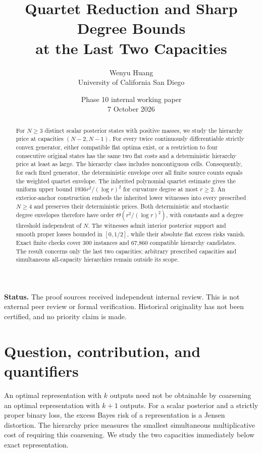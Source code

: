 \documentclass[11pt]{article}
\title{Quartet Reduction and Sharp Degree Bounds\\ at the Last Two Capacities}
\author{Wenyu Huang\\\small University of California San Diego}
\date{Phase 10 internal working paper\\7 October 2026}
\theoremstyle{remark}\newtheorem{remark}[theorem]{Remark}
\begin{document}
\maketitle
\begin{center}\begin{minipage}{0.93\textwidth}\small
\textbf{Status.} The proof sources received independent internal review.
This is not external peer review or formal verification. Historical
originality has not been certified, and no priority claim is made.
\end{minipage}\end{center}

\begin{abstract}
For $N\ge3$ distinct scalar posterior states with positive masses, we study
the hierarchy price at capacities $(N-2,N-1)$. For every twice
continuously differentiable strictly convex generator, either compatible
flat optima exist, or a restriction to four consecutive original states
has the same two flat costs and a deterministic hierarchy price at least
as large. The hierarchy class includes noncontiguous cells. Consequently,
for each fixed generator, the deterministic envelope over all finite
source counts equals the weighted quartet envelope. The inherited
polynomial quartet estimate gives the uniform upper bound
$1936r^2/(\log r)^2$ for curvature degree at most $r\ge2$.
An exterior-anchor construction embeds the inherited lower witnesses
into every prescribed $N\ge4$ and preserves their deterministic prices.
Both deterministic and stochastic degree envelopes therefore have order
$\Theta(r^2/(\log r)^2)$, with constants and a degree threshold independent
of $N$. The witnesses admit interior posterior support and smooth proper
losses bounded in $[0,1/2]$, while their absolute flat excess risks vanish.
Exact finite checks cover 300 instances and 67,860 compatible hierarchy
candidates. The result concerns only the last two capacities; arbitrary
prescribed capacities and simultaneous all-capacity hierarchies remain
outside its scope.
\end{abstract}

\section{Question, contribution, and quantifiers}
An optimal representation with $k$ outputs need not be obtainable by
coarsening an optimal representation with $k+1$ outputs. For a scalar
posterior and a strictly proper binary loss, the excess Bayes risk of a
representation is a Jensen distortion. The hierarchy price measures the
smallest simultaneous multiplicative cost of requiring this coarsening.
We study the two capacities immediately below exact representation.
\end{document}
